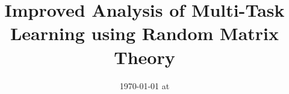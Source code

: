 \documentclass{article}
\begin{document}
\title{Improved Analysis of Multi-Task Learning using Random Matrix Theory}
\date{}
\maketitle
\date{{\ddmmyyyydate\today} at \currenttime}




\end{document}
